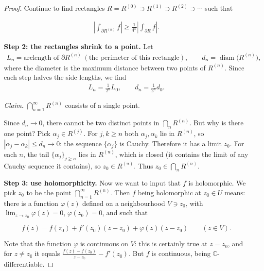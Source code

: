 \documentclass[11pt]{article}
\theoremstyle{plain}
\theoremstyle{definition}
\theoremstyle{remark}
\numberwithin{equation}{section}
\newcommand{\be}{\begin{eqnarray}}
\newcommand{\ee}{\end{eqnarray}}
\newcommand{\C}{\mathbb{C}}
\begin{document}
\begin{proof}
Continue to find rectangles $R=R^{(0)}\supset R^{(1)}\supset R^{(2)}\supset\cdots$ such that
\begin{tcolorbox}[enhanced,colback=lightgreen,colframe=ForestGreen,boxrule=0.7pt,arc=2pt]
\be
 \left|\int_{\partial R^{(n)}}f\right|\geq\frac1{4^n}\left|\int_{\partial R}f\right|.
 \label{eq:4n}
\ee
\end{tcolorbox}

\textbf{Step 2: the rectangles shrink to a point.} Let
\be
 L_n=\text{arclength of }\partial R^{(n)}\ (\text{the perimeter of this rectangle}),\qquad
 d_n=\operatorname{diam}\bigl(R^{(n)}\bigr),
\ee
where the diameter is the maximum distance between two points of
$R^{(n)}$. Since each step halves the side lengths, we find
\be
 L_n=\frac1{2^n}L_0,\qquad d_n=\frac1{2^n}d_0.
\ee

\emph{Claim.} $\bigcap_{n=1}^{\infty}R^{(n)}$ consists of a single point.

Since $d_n\to0$, there cannot be two distinct points in
$\bigcap_nR^{(n)}$. But why is there one point? Pick $\alpha_j\in R^{(j)}$.
For $j,k\geq n$ both $\alpha_j,\alpha_k$ lie in $R^{(n)}$, so
$|\alpha_j-\alpha_k|\leq d_n\to0$: the sequence $\{\alpha_j\}$ is Cauchy.
Therefore it has a limit $z_0$. For each $n$, the tail $\{\alpha_j\}_{j\geq n}$
lies in $R^{(n)}$, which is closed (it contains the limit of any Cauchy
sequence it contains), so $z_0\in R^{(n)}$. Thus
$z_0\in\bigcap_{n}R^{(n)}$.

\textbf{Step 3: use holomorphicity.} Now we want to input that $f$ is
holomorphic. We pick $z_0$ to be the point $\bigcap_{n=1}^{\infty}R^{(n)}$.
Then $f$ being holomorphic at $z_0\in U$ means: there is a function
$\varphi(z)$ defined on a neighbourhood $V\ni z_0$, with
$\lim_{z\to z_0}\varphi(z)=0$, $\varphi(z_0)=0$, and such that
\begin{tcolorbox}[enhanced,colback=lightgreen,colframe=ForestGreen,boxrule=0.7pt,arc=2pt]
\[ f(z)=f(z_0)+f'(z_0)(z-z_0)+\varphi(z)(z-z_0)\qquad(z\in V). \]
\end{tcolorbox}
Note that the function $\varphi$ is continuous on $V$: this is certainly true at $z=z_0$, and for $z\neq z_0$ it equals $\frac{f(z)-f(z_0)}{z-z_0}-f'(z_0).$ But $f$ is
continuous, being $\C$-differentiable.


\end{proof}
\end{document}
